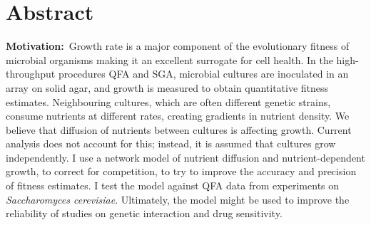 \section*{Abstract}
\label{sec:abstract}


\textbf{Motivation:}~Growth rate is a major component of the
evolutionary fitness of microbial organisms making it an excellent
surrogate for cell health.
In the high-throughput procedures QFA and SGA, microbial cultures are
inoculated in an array on solid agar, and growth is measured to obtain
quantitative fitness estimates.
%
%
Neighbouring cultures, which are often different genetic strains,
consume nutrients at different rates, creating gradients in nutrient
density. We believe that diffusion of nutrients between cultures is
affecting growth. Current analysis does not account for this; instead,
it is assumed that cultures grow independently. I use a network model
of nutrient diffusion and nutrient-dependent growth, to correct for
competition, to try to improve the accuracy and precision of fitness
estimates. I test the model against QFA data from experiments on
\textit{Saccharomyces cerevisiae}. Ultimately, the model might be used
to improve the reliability of studies on genetic interaction and drug
sensitivity.
\\
